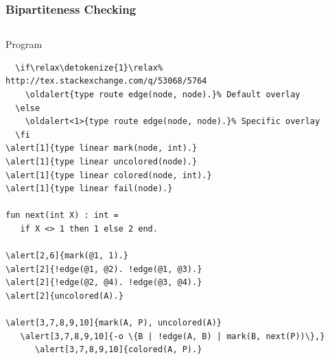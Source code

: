 \documentclass{beamer}
\let\oldalert\alert
\renewcommand{\alert}[2][]{%
  \if\relax\detokenize{#1}\relax%
    \oldalert{#2}%
  \else
    \oldalert<#1>{#2}%
  \fi}
\begin{document}
\begin{frame}[fragile]
  \frametitle{Bipartiteness Checking}
  \begin{columns}[t]
     \begin{block}{Program}
       \begin{Verbatim}[fontsize=\tiny,commandchars=\\\{\},frame=single]
\alert[1]{type route edge(node, node).}
\alert[1]{type linear mark(node, int).}
\alert[1]{type linear uncolored(node).}
\alert[1]{type linear colored(node, int).}
\alert[1]{type linear fail(node).}

fun next(int X) : int =
   if X <> 1 then 1 else 2 end.

\alert[2,6]{mark(@1, 1).}
\alert[2]{!edge(@1, @2). !edge(@1, @3).}
\alert[2]{!edge(@2, @4). !edge(@3, @4).}
\alert[2]{uncolored(A).}

\alert[3,7,8,9,10]{mark(A, P), uncolored(A)}
   \alert[3,7,8,9,10]{-o \{B | !edge(A, B) | mark(B, next(P))\},}
      \alert[3,7,8,9,10]{colored(A, P).}


\end{Verbatim}
\end{block}
\end{columns}
\end{frame}
\end{document}
